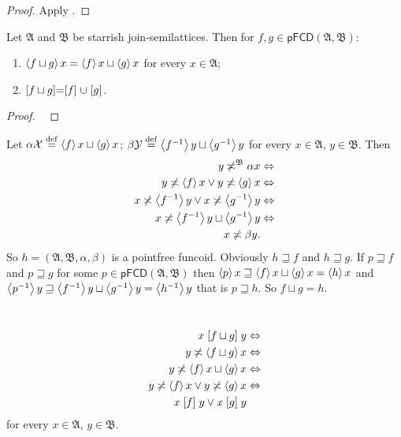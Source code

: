 \begin{proof}
Apply \cite{pm:complete-lattice-criteria}.\end{proof}
\begin{thm}
\label{pf-fin-join}Let $\mathfrak{A}$ and $\mathfrak{B}$ be starrish
join-semilattices. Then for $f,g\in\mathsf{pFCD}(\mathfrak{A},\mathfrak{B})$:
\begin{enumerate}
\item \label{pf-fin-j-f}$\left\langle f\sqcup g\right\rangle x=\left\langle f\right\rangle x\sqcup\left\langle g\right\rangle x$
for every $x\in\mathfrak{A}$;
\item \label{pf-fin-j-r}$\mathrel{\left[f\sqcup g\right]}=\mathrel{\left[f\right]}\cup\mathrel{\left[g\right]}$.
\end{enumerate}
\end{thm}
\begin{proof}
~\end{proof}
\begin{widedisorder}
\item [{\ref{pf-fin-j-f}}] Let $\alpha\mathcal{X}\overset{\mathrm{def}}{=}\left\langle f\right\rangle x\sqcup\left\langle g\right\rangle x$;
$\beta\mathcal{Y}\overset{\mathrm{def}}{=}\left\langle f^{-1}\right\rangle y\sqcup\left\langle g^{-1}\right\rangle y$ for
every $x\in\mathfrak{A}$, $y\in\mathfrak{B}$. Then
\begin{align*}
y\not\asymp^{\mathfrak{B}}\alpha x & \Leftrightarrow\\
y\not\asymp\left\langle f\right\rangle x\lor y\not\asymp\left\langle g\right\rangle x & \Leftrightarrow\\
x\not\asymp\left\langle f^{-1}\right\rangle y\lor x\not\asymp\left\langle g^{-1}\right\rangle y & \Leftrightarrow\\
x\not\asymp\left\langle f^{-1}\right\rangle y\sqcup\left\langle g^{-1}\right\rangle y & \Leftrightarrow\\
x\not\asymp\beta y.
\end{align*}
So $h=(\mathfrak{A},\mathfrak{B},\alpha,\beta)$ is a pointfree funcoid.
Obviously $h\sqsupseteq f$ and $h\sqsupseteq g$. If $p\sqsupseteq f$
and $p\sqsupseteq g$ for some $p\in\mathsf{pFCD}(\mathfrak{A},\mathfrak{B})$
then $\left\langle p\right\rangle x\sqsupseteq\left\langle f\right\rangle x\sqcup\left\langle g\right\rangle x=\left\langle h\right\rangle x$
and $\left\langle p^{-1}\right\rangle y\sqsupseteq\left\langle f^{-1}\right\rangle y\sqcup\left\langle g^{-1}\right\rangle y=\left\langle h^{-1}\right\rangle y$
that is $p\sqsupseteq h$. So $f\sqcup g=h$.
\item [{\ref{pf-fin-j-r}}] ~
\begin{align*}
x\mathrel{\left[f\sqcup g\right]}y & \Leftrightarrow\\
y\not\asymp\left\langle f\sqcup g\right\rangle x & \Leftrightarrow\\
y\not\asymp\left\langle f\right\rangle x\sqcup\left\langle g\right\rangle x & \Leftrightarrow\\
y\not\asymp\left\langle f\right\rangle x\lor y\not\asymp\left\langle g\right\rangle x & \Leftrightarrow\\
x\mathrel{\left[f\right]}y\lor x\mathrel{\left[g\right]}y
\end{align*}
for every $x\in\mathfrak{A}$, $y\in\mathfrak{B}$.\end{widedisorder}


